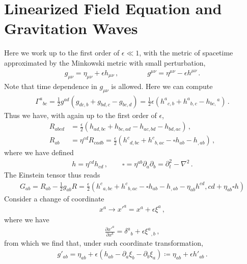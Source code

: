 \documentclass[11pt, onesided]{book}
\theoremstyle{break}
\theoremstyle{break}
\newcommand{\pd}{\partial}
\begin{document}
\section[Linearized Field Equation and Gravitation Waves]{\color{red}Linearized Field Equation and Gravitation Waves\color{black}}
Here we work up to the first order of $\epsilon \ll 1$, with the metric of spacetime approximated by the Minkowski metric with small perturbation, 
\begin{align*}
g_{\mu\nu} = \eta_{\mu\nu} + \epsilon h_{\mu\nu}\,,\qquad\qquad
g^{\mu\nu} = \eta^{\mu\nu} - \epsilon h^{\mu\nu}
\,.
\end{align*}
Note that time dependence in $g_{\mu\nu}$ is allowed. Here we can compute
\begin{align*}
\Gamma^{a}{}_{bc} = \frac{1}{2}g^{ad}\left( g_{dc,b} + g_{bd,c} -g_{bc,d}\right) = \frac{1}{2}\epsilon\left( h^{a}{}_{c,b} + h^a{}_{b,c} - h_{bc,}{}^a\right)\,.
\end{align*}
Thus we have, with again up to the first order of $\epsilon$, 
\begin{align*}
R_{abcd} &= \frac{\epsilon}{2}\left( h_{ad,bc} + h_{bc,ad} - h_{ac,bd} - h_{bd,ac}\right)\,,\\
R_{ab} &= \eta^{cd}R_{cadb} = \frac{\epsilon}{2}\left(h^c{}_{d,bc} + h^c{}_{b,ac} - \square h_{ab} - h_{,ab} \right)\,,
\end{align*}
where we have defined
\begin{align*}
h = \eta^{cd}h_{cd}\,,\qquad \square = \eta^{ab}\pd_a\pd_b = \pd_t^2 - \nabla^2\,.
\end{align*}
The Einstein tensor thus reads
\begin{align*}
G_{ab} = R_{ab} - \frac{1}{2}g_{ab}R= \frac{\epsilon}{2}\left( 
h^c{}_{a,bc} + h^c{}_{b,ac} - \square h_{ab} - h_{,ab} - \eta_{ab}h^{cd}{,cd} + \eta_{ab}\square h\right)
\end{align*}
Consider a change of coordinate
\begin{align*}
x^a \to x'^a = x^a + \epsilon \xi^a\,,
\end{align*}
where we have
\begin{align*}
\frac{\pd x'^a}{\pd x^b} = \delta^a{}_b + \epsilon \xi^a{}_{,b}\,,
\end{align*}
from which we find that, under such coordinate transformation,
\begin{align*}
g'_{ab} = \eta_{ab} + \epsilon( h_{ab} - \pd_a\xi_b - \pd_b \xi_a) \coloneqq \eta_{ab} + \epsilon h'_{ab}\,.
\end{align*}
\end{document}
